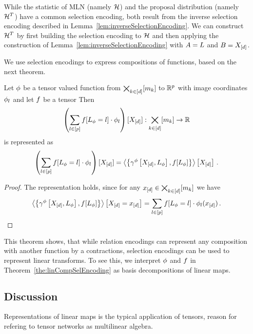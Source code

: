 \begin{example}
	While the statistic of MLN (namely $\mathcal{H}$) and the proposal distribution (namely $\mathcal{H}^T$) have a common selection encoding, both result from the inverse selection encoding described in Lemma~\ref{lem:inverseSelectionEncoding}.
	We can construct $\mathcal{H}^T$ by first building the selection encoding to $\mathcal{H}$ and then applying the construction of Lemma~\ref{lem:inverseSelectionEncoding} with $A=L$ and $B=X_{[d]}$.
\end{example}


We use selection encodings to express compositions of functions, based on the next theorem.

\begin{theorem}\label{the:linCompSelEncoding}
	Let $\phi$ be a tensor valued function from $\bigtimes_{k\in[d]}[m_{k}]$ to $\mathbb{R}^{p}$ with image coordinates $\phi_l$ and let $f$ be a tensor 
	Then
		\[ \left(\sum_{l\in[p]}f[L_{\phi}=l]\cdot \phi_l \right) [X_{[d]}] : \bigtimes_{k\in[d]}[m_{k}] \rightarrow \mathbb{R} \]
	is represented as
		\[ \left(\sum_{l\in[p]}f[L_{\phi}=l]\cdot \phi_l \right) [X_{[d]}] 
		 = \left\langle \left\{\gamma^{\phi}\left[X_{[d]},L_{\phi}\right] , f[L_{\phi}]\right\}\right\rangle \left[ X_{[d]} \right] \, . \]
\end{theorem}
\begin{proof}
	The representation holds, since for any $x_{[d]}\in\bigtimes_{k\in[d]}[m_{k}]$ we have
	\begin{align*}
		\left\langle \left\{\gamma^{\phi}\left[X_{[d]},L_{\phi}\right] , f[L_{\phi}]\right\}\right\rangle \left[ X_{[d]}=x_{[d]} \right]  
		= \sum_{l\in[p]}f[L_{\phi}=l]\cdot\phi_l(x_{[d]}) \, . 
	\end{align*} 
\end{proof}

This theorem shows, that while relation encodings can represent any composition with another function by a contractions, selection encodings can be used to represent linear transforms.
To see this, we interpret $\phi$ and $f$ in Theorem~\ref{the:linCompSelEncoding} as basis decompositions of linear maps.


\subsection{Discussion}

Representations of linear maps is the typical application of tensors, reason for refering to tensor networks as multilinear algebra.
